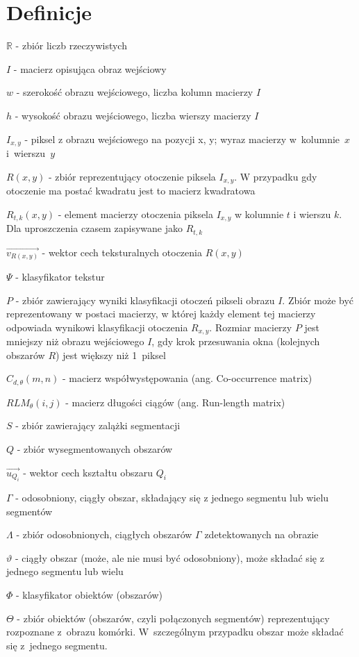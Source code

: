 \chapter{Definicje}
\begin{list}{}{\leftmargin=0em}

\item $\mathbb{R}$ - zbiór liczb rzeczywistych
\item $I$ - macierz opisująca obraz wejściowy
\item $w$ - szerokość obrazu wejściowego, liczba kolumn macierzy $I$
\item $h$ - wysokość obrazu wejściowego, liczba wierszy macierzy $I$
\item $I_{x,y}$ - piksel z obrazu wejściowego na pozycji x, y; wyraz macierzy w~kolumnie~$x$ i~wierszu~$y$
\item $R(x,y)$ - zbiór reprezentujący otoczenie piksela $I_{x,y}$. W przypadku gdy otoczenie ma postać kwadratu jest to macierz kwadratowa
\item $R_{t,k}(x,y)$ - element macierzy otoczenia piksela $I_{x,y}$ w kolumnie $t$ i wierszu $k$. Dla uproszczenia czasem zapisywane jako $R_{t,k}$
\item $\vec{v_{R(x,y)}}$ - wektor cech teksturalnych otoczenia $R(x,y)$
\item $\Psi$ - klasyfikator tekstur
\item $P$ - zbiór zawierający wyniki klasyfikacji otoczeń pikseli obrazu $I$. Zbiór może być reprezentowany w postaci macierzy, w której każdy element tej macierzy odpowiada wynikowi klasyfikacji otoczenia $R_{x,y}$. Rozmiar macierzy $P$ jest mniejszy niż obrazu wejściowego $I$, gdy krok przesuwania okna (kolejnych obszarów $R$) jest większy niż 1~piksel
\item $C_{d,\theta}(m,n)$ - macierz współwystępowania (ang. Co-occurrence matrix)
\item $RLM_{\theta}(i,j)$ - macierz długości ciągów (ang. Run-length matrix)

\item $S$ - zbiór zawierający zalążki segmentacji
\item $Q$ - zbiór wysegmentowanych obszarów
\item $\vec{u_{Q_i}}$ - wektor cech kształtu obszaru $Q_i$
\item $\Gamma$ - odosobniony, ciągły obszar, składający się z jednego segmentu lub wielu segmentów
\item $\Lambda$ - zbiór odosobnionych, ciągłych obszarów $\Gamma$ zdetektowanych na obrazie
\item $\vartheta$ - ciągły obszar (może, ale nie musi być odosobniony), może składać się z jednego segmentu lub wielu
\item $\Phi$ - klasyfikator obiektów (obszarów)
\item $\Theta$ - zbiór obiektów (obszarów, czyli połączonych segmentów) reprezentujący rozpoznane z~obrazu komórki. W~szczególnym przypadku obszar może składać się z~jednego segmentu.

\end{list}